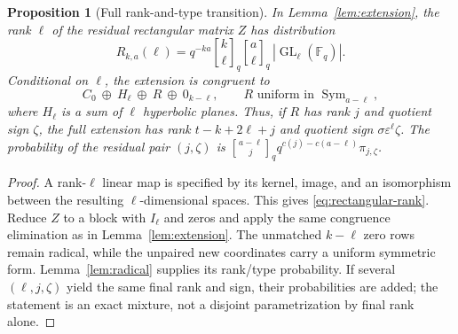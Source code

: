 \documentclass[11pt,a4paper]{article}
\newtheorem{proposition}[theorem]{Proposition}
\theoremstyle{definition}
\theoremstyle{remark}
\newcommand{\F}{\mathbb F}
\newcommand{\Sym}{\operatorname{Sym}}
\newcommand{\GL}{\operatorname{GL}}
\newcommand{\eps}{\varepsilon}
\newcommand{\gb}[2]{\genfrac{[}{]}{0pt}{}{#1}{#2}_{q}}
\begin{document}
\begin{proposition}[Full rank-and-type transition]\label{prop:full-transition}
In Lemma~\ref{lem:extension}, the rank $\ell$ of the residual rectangular
matrix $Z$ has distribution
\begin{equation}\label{eq:rectangular-rank}
 R_{k,a}(\ell)=q^{-ka}\gb k\ell\gb a\ell\,|\GL_\ell(\F_q)|.
\end{equation}
Conditional on $\ell$, the extension is congruent to
\[
 C_0\ \oplus\ H_\ell\ \oplus\ R\ \oplus\ 0_{k-\ell},
 \qquad R\text{ uniform in }\Sym_{a-\ell},
\]
where $H_\ell$ is a sum of $\ell$ hyperbolic planes. Thus, if $R$ has rank
$j$ and quotient sign $\zeta$, the full extension has rank
$t-k+2\ell+j$ and quotient sign $\sigma\eps^\ell\zeta$.
The probability of the residual pair $(j,\zeta)$ is
$\gb{a-\ell}{j}q^{c(j)-c(a-\ell)}\pi_{j,\zeta}$.
\end{proposition}
\begin{proof}
A rank-$\ell$ linear map is specified by its kernel, image, and an
isomorphism between the resulting $\ell$-dimensional spaces. This gives
\eqref{eq:rectangular-rank}. Reduce $Z$ to a block with $I_\ell$ and zeros
and apply the same congruence elimination as in Lemma~\ref{lem:extension}.
The unmatched $k-\ell$ zero rows remain radical, while the unpaired new
coordinates carry a uniform symmetric form. Lemma~\ref{lem:radical} supplies
its rank/type probability. If several $(\ell,j,\zeta)$ yield the same final
rank and sign, their probabilities are added; the statement is an exact
mixture, not a disjoint parametrization by final rank alone.
\end{proof}
\end{document}
